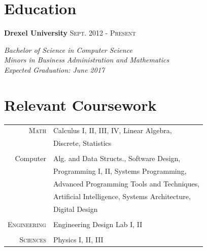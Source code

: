 \documentclass[10pt]{article}
\begin{document}
{\begin{minipage}[t]{0.44\textwidth}

\section{Education} 

\textbf{Drexel University} \hfill \textsc{Sept. 2012 - Present}

\textit{\hspace*{5 mm}Bachelor of Science in Computer Science}\\
\textit{\hspace*{5 mm}Minors in Business Administration and Mathematics}\\
\textit{\hspace*{5 mm}Expected Graduation: June 2017}\\



\section{Relevant Coursework} 


\begin{tabular}{rl}
\textsc{Math}
& Calculus I, II, III, IV, Linear Algebra, \\
& Discrete, Statistics\\\\
Computer
& Alg. and Data Structs., Software Design, \\
& Programming I, II, Systems Programming, \\
& Advanced Programming Tools and Techniques, \\
& Artificial Intelligence, Systems Architecture, \\
& Digital Design \\\\
\textsc{Engineering}
& Engineering Design Lab I, II \\\\
\textsc{Sciences}
& Physics I, II, III
\end{tabular}\\[10pt]




\end{minipage}}
\end{document}
